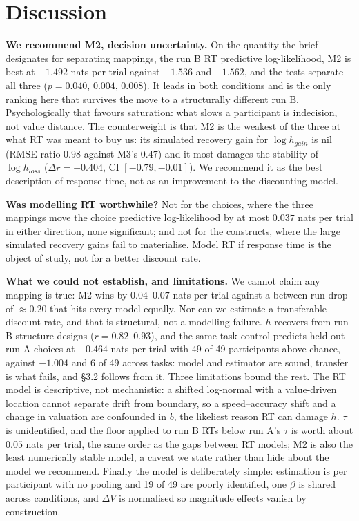 \documentclass[11pt,a4paper]{article}
\begin{document}
\section{Discussion}

\textbf{We recommend M2, decision uncertainty.} On the quantity the brief designates for
separating mappings, the run B RT predictive log-likelihood, M2 is best at $-1.492$ nats per
trial against $-1.536$ and $-1.562$, and the tests separate all three ($p=0.040$, $0.004$,
$0.008$). It leads in both conditions and is the only ranking here that survives the move to a
structurally different run B. Psychologically that favours
saturation: what slows a participant is indecision, not value distance. The counterweight is
that M2 is the weakest of the three
at what RT was meant to buy us: its simulated recovery gain for $\log h_{gain}$ is nil (RMSE
ratio $0.98$ against M3's $0.47$) and it most damages the stability of $\log h_{loss}$
($\Delta r=-0.404$, CI $[-0.79,-0.01]$). We recommend it as the best description of response
time, not as an improvement to the discounting model.

\textbf{Was modelling RT worthwhile?} Not for the choices, where the three mappings move the
choice predictive log-likelihood by at most $0.037$ nats per trial in either direction, none
significant; and not for the constructs, where the large simulated recovery gains fail to
materialise. Model RT if response time is the object of study, not for a better discount rate.

\textbf{What we could not establish, and limitations.} We cannot claim any mapping is true: M2
wins by $0.04$--$0.07$ nats per trial against a between-run drop of $\approx0.20$ that hits every
model equally. Nor can we estimate a transferable discount rate, and that is structural, not a
modelling failure. $h$ recovers from run-B-structure designs ($r=0.82$--$0.93$), and the
same-task control predicts held-out run A choices at $-0.464$ nats per trial with 49 of 49
participants above chance, against $-1.004$ and 6 of 49 across tasks: model and estimator are
sound, transfer is what fails, and \S3.2 follows from it. Three limitations bound the rest. The
RT model is descriptive, not mechanistic: a shifted log-normal with a value-driven location
cannot separate drift from boundary, so a speed--accuracy shift and a change in valuation are
confounded in $b$, the likeliest reason RT can damage $h$. $\tau$ is unidentified, and the
floor applied to run B RTs below run A's $\tau$ is worth about $0.05$ nats per trial, the same
order as the gaps between RT models; M2 is also the least numerically stable model, a caveat we
state rather than hide about the model we recommend. Finally the model is deliberately simple:
estimation is per participant with no pooling and 19 of 49 are poorly identified, one $\beta$ is
shared across conditions, and $\Delta V$ is normalised so magnitude effects vanish by
construction.
\end{document}
